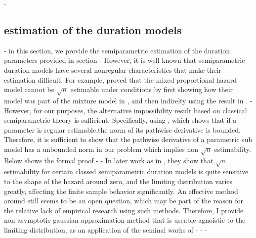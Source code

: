 \documentclass{article}
\begin{document}
- \subsection{ estimation of the duration models } 
    - in this section, we provide the semiparametric estimation of the duration parameters provided in  section \todo
    - However, it is well known that semiparametric duration models have several nonregular characteristics that make their estimation difficult. For example, \cite{hahn 1994} proved that the mixed proportional hazard model cannot be $ \sqrt {n} $ estimable under conditions by first showing how their model was part of the mixture model in \cite{chamberlain 1986} , and then indirelty using the result in\cite{ Pfanzagl  2000} . 
    - However, for our purposes, the alternative impossibility result based on classical semiparametric theory is sufficient. Specifically, using \cite{van der vaart 1991}, which shows that if a parameter is regular estimable,the norm of its pathwise derivative is bounded. Therefore, it is sufficient to show that the pathwise derivative of a parametric sub model has a unbounded norm in our problem which implies non $\sqrt{n} $ estimability. Below shows the formal proof \todo
    - 
    - In later work as in \cite{ridder and weid 2003} , they show that $\sqrt{n} $ estimability for certain classed semiparametric duration models is quite sensitive to the shape of the hazard around zero, and the limiting distribution varies greatly, affecting the finite sample behavior significantly. An effective method around still seems to be an open question, which may be part of the reason for the relative lack of empirical research using such methods. Therefore, I provide non asymptotic gaussian approximation method that is useable agnoistic to the limiting distribution, as an application of the seminal works of \cite{chernozhukov , 2012}
    - 
    - 
    - 




\end{document}
